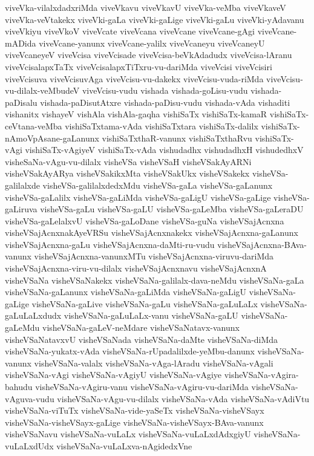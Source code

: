{viveVka-vilalxdadxriMda
viveVkavu
viveVkavU
viveVka-veMba
viveVkaveV
viveVka-veVtakekx
viveVki-gaLa
viveVki-gaLige
viveVki-gaLu
viveVki-yAdavanu
viveVkiyu
viveVkoV
viveVcate
viveVcana
viveVcane
viveVcane-gAgi
viveVcane-mADida
viveVcane-yanunx
viveVcane-yalilx
viveVcaneyu
viveVcaneyU
viveVcaneyeV
viveVcisa
viveVcisade
viveVcisa-beVkAdadudx
viveVcisa-lAranu
viveVcisalapxTaTx
viveVcisalapxTiTxru-vu-dariMda
viveVcisi
viveVcisiri
viveVcisuva
viveVcisuvAga
viveVcisu-vu-dakekx
viveVcisu-vuda-riMda
viveVcisu-vu-dilalx-veMbudeV
viveVcisu-vudu
vishada
vishada-goLisu-vudu
vishada-paDisalu
vishada-paDisutAtxre
vishada-paDisu-vudu
vishada-vAda
vishaditi
vishanitx
vishayeV
vishAla
vishAla-gaqha
vishiSaTx
vishiSaTx-kamaR
vishiSaTx-ceVtana-veMba
vishiSaTxtama-vAda
vishiSaTxtara
vishiSaTx-dalilx
vishiSaTx-nAmoVpAsane-gaLanunx
vishiSaTxthaR-vanunx
vishiSaTxthaRvu
vishiSaTx-vAgi
vishiSaTx-vAgiyeV
vishiSaTx-vAda
vishudadhx
vishudadhxH
vishudedhxV
visheSaNa-vAgu-vu-dilalx
visheVSa
visheVSaH
visheVSakAyARNi
visheVSakAyARya
visheVSakikxMta
visheVSakUkx
visheVSakekx
visheVSa-galilalxde
visheVSa-galilalxdedxMdu
visheVSa-gaLa
visheVSa-gaLanunx
visheVSa-gaLalilx
visheVSa-gaLiMda
visheVSa-gaLigU
visheVSa-gaLige
visheVSa-gaLiruva
visheVSa-gaLu
visheVSa-gaLU
visheVSa-gaLeMba
visheVSa-gaLeraDU
visheVSa-gaLelalxvU
visheVSa-gaLoDane
visheVSa-guNa
visheVSajAcnxna
visheVSajAcnxnakAyeVRSu
visheVSajAcnxnakekx
visheVSajAcnxna-gaLanunx
visheVSajAcnxna-gaLu
visheVSajAcnxna-daMti-ru-vudu
visheVSajAcnxna-BAva-vanunx
visheVSajAcnxna-vanunxMTu
visheVSajAcnxna-viruvu-dariMda
visheVSajAcnxna-viru-vu-dilalx
visheVSajAcnxnavu
visheVSajAcnxnA
visheVSaNa
visheVSaNakekx
visheVSaNa-galilalx-dava-neMdu
visheVSaNa-gaLa
visheVSaNa-gaLanunx
visheVSaNa-gaLiMda
visheVSaNa-gaLigU
visheVSaNa-gaLige
visheVSaNa-gaLive
visheVSaNa-gaLu
visheVSaNa-gaLuLaLx
visheVSaNa-gaLuLaLxdudx
visheVSaNa-gaLuLaLx-vanu
visheVSaNa-gaLU
visheVSaNa-gaLeMdu
visheVSaNa-gaLeV-neMdare
visheVSaNatavx-vanunx
visheVSaNatavxvU
visheVSaNada
visheVSaNa-daMte
visheVSaNa-diMda
visheVSaNa-yukatx-vAda
visheVSaNa-rUpadalilxde-yeMbu-danunx
visheVSaNa-vanunx
visheVSaNa-valalx
visheVSaNa-vAga-lAradu
visheVSaNa-vAgali
visheVSaNa-vAgi
visheVSaNa-vAgiyU
visheVSaNa-vAgiye
visheVSaNa-vAgira-bahudu
visheVSaNa-vAgiru-vanu
visheVSaNa-vAgiru-vu-dariMda
visheVSaNa-vAguva-vudu
visheVSaNa-vAgu-vu-dilalx
visheVSaNa-vAda
visheVSaNa-vAdiVtu
visheVSaNa-viTuTx
visheVSaNa-vide-yaSeTx
visheVSaNa-visheVSayx
visheVSaNa-visheVSayx-gaLige
visheVSaNa-visheVSayx-BAva-vanunx
visheVSaNavu
visheVSaNa-vuLaLx
visheVSaNa-vuLaLxdAdxgiyU
visheVSaNa-vuLaLxdUdx
visheVSaNa-vuLaLxva-nAgidedxVne
}
